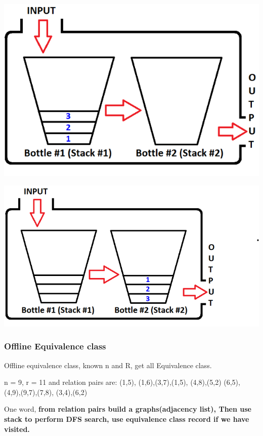 \documentclass[a4paper,11pt,twoside]{book}
\begin{document}
	\begin{center}
		\includegraphics[scale=0.3]{pics/sq1.png} 
	\end{center}
	\begin{center}
		\includegraphics[scale=0.3]{pics/sq2.png} 
	\end{center}
	


\subsubsection{Offline Equivalence class}

	\par Offline equivalence class, known n and R, get all Equivalence class. 
	
	\par n = 9, r = 11 and relation pairs are:
	(1,5), (1,6),(3,7),(1,5), (4,8),(5,2)
	(6,5), (4,9),(9,7),(7,8), (3,4),(6,2)
	
	
	
	\par One word, \textbf{from relation pairs build a graphs(adjacency list), Then use stack to perform DFS search, use equivalence class record if we have visited.}
	
\end{document}
